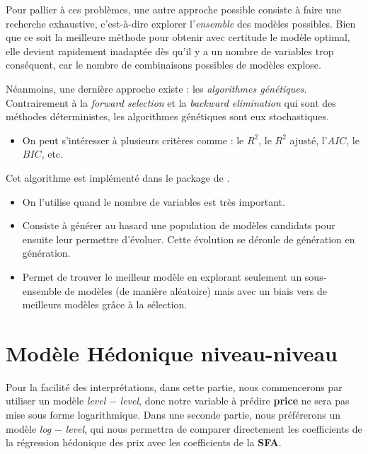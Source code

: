 \documentclass[
  12pt,
]{report}
\providecommand{\tightlist}{%
  \setlength{\itemsep}{0pt}\setlength{\parskip}{0pt}}\usepackage{longtable,booktabs,array}
\renewcommand{\texttt}[1]{\colorbox{light}{\color{highlight}{\ttfamily{#1}}}}
\begin{document}
Pour pallier à ces problèmes, une autre approche possible consiste à
faire une recherche exhaustive, c'est-à-dire explorer l'\emph{ensemble}
des modèles possibles. Bien que ce soit la meilleure méthode pour
obtenir avec certitude le modèle optimal, elle devient rapidement
inadaptée dès qu'il y a un nombre de variables trop conséquent, car le
nombre de combinaisons possibles de modèles explose.

Néanmoins, une dernière approche existe : les \emph{algorithmes
génétiques}. Contrairement à la \emph{forward selection} et la
\emph{backward elimination} qui sont des méthodes déterministes, les
algorithmes génétiques sont eux stochastiques.

\begin{itemize}
\tightlist
\item
  On peut s'intéresser à plusieurs critères comme : le \(R^2\), le
  \(R^2\) ajusté, l'\(AIC\), le \(BIC\), etc.
\end{itemize}

Cet algorithme est implémenté dans le package  de
\texttt{\{glmulti\}}.

\begin{itemize}
\item
  On l'utilise quand le nombre de variables est très important.
\item
  Consiste à générer au hasard une population de modèles candidats pour
  ensuite leur permettre d'évoluer. Cette évolution se déroule de
  génération en génération.
\item
  Permet de trouver le meilleur modèle en explorant seulement un
  sous-ensemble de modèles (de manière aléatoire) mais avec un biais
  vers de meilleurs modèles grâce à la sélection.
\end{itemize}

\newpage

\section{Modèle Hédonique
niveau-niveau}\label{moduxe8le-huxe9donique-niveau-niveau}

Pour la facilité des interprétations, dans cette partie, nous
commencerons par utiliser un modèle \emph{level} \(-\) \emph{level},
donc notre variable à prédire \textbf{price} ne sera pas mise sous forme
logarithmique. Dans une seconde partie, nous préférerons un modèle
\emph{log} \(-\) \emph{level}, qui nous permettra de comparer
directement les coefficients de la régression hédonique des prix avec
les coefficients de la \textbf{SFA}.
\end{document}
